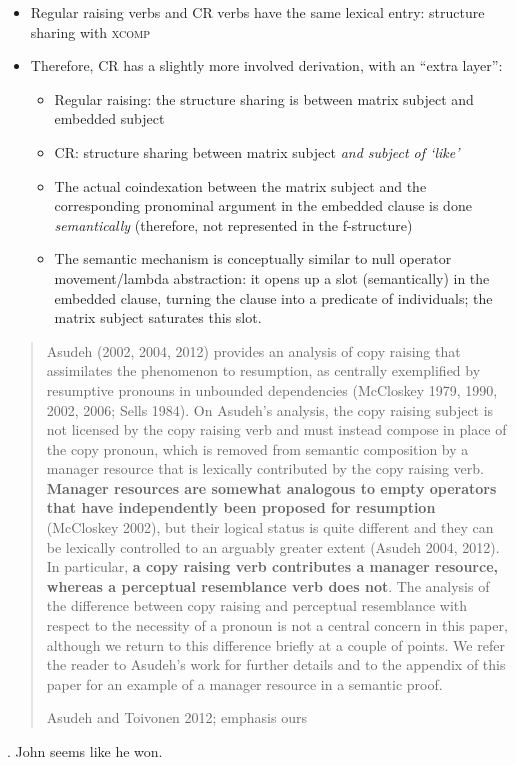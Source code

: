 \documentclass[11pt]{article}
\begin{document}
\begin{itemize}
  \item Regular raising verbs and CR verbs have the same lexical entry: structure sharing with \textsc{xcomp}

  \item Therefore, CR has a slightly more involved derivation, with an ``extra layer'': \begin{itemize}
      \item Regular raising: the structure sharing is between matrix subject and embedded subject
      \item CR: structure sharing between matrix subject \emph{and subject of `like'}
      \item The actual coindexation between the matrix subject and the corresponding pronominal argument in the embedded clause is done \emph{semantically} (therefore, not represented in the f-structure)
      \item The semantic mechanism is conceptually similar to null operator movement\slash lambda abstraction: it opens up a slot (semantically) in the embedded clause, turning the clause into a predicate of individuals; the matrix subject saturates this slot.
    \end{itemize}
\end{itemize}



\blockquote[Asudeh and Toivonen 2012; emphasis ours]{
  Asudeh (2002, 2004, 2012) provides an analysis of copy raising that assimilates the phenomenon to resumption, as centrally exemplified by resumptive pronouns in unbounded dependencies (McCloskey 1979, 1990, 2002, 2006; Sells 1984). 
  On Asudeh’s analysis, the copy raising subject is not licensed by the copy raising verb and must instead compose in place of the copy pronoun, which is removed from semantic composition by a manager resource that is lexically contributed by the copy raising verb. 
  \textbf{Manager resources are somewhat analogous to empty operators that have independently been proposed for resumption} (McCloskey 2002), but their logical status is quite different and they can be lexically controlled to an arguably greater extent (Asudeh 2004, 2012). 
  In particular, \textbf{a copy raising verb contributes a manager resource, whereas a perceptual resemblance verb does not}. 
  The analysis of the difference between copy raising and perceptual resemblance with respect to the necessity of a pronoun is not a central concern in this paper, although we return to this difference briefly at a couple of points. 
  We refer the reader to Asudeh’s work for further details and to the appendix of this paper for an example of a manager resource in a semantic proof.
}
\ex. John seems like he won.
\end{document}
